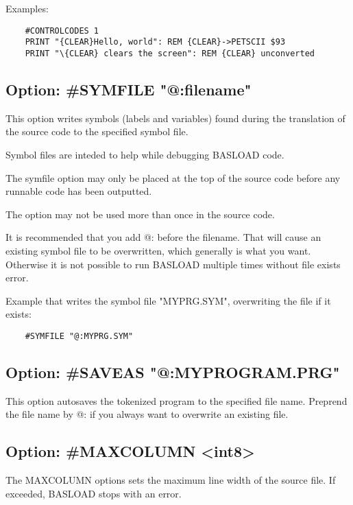 \documentclass{article}
\begin{document}
        Examples:

    \begin{verbatim}
    #CONTROLCODES 1
    PRINT "{CLEAR}Hello, world": REM {CLEAR}->PETSCII $93
    PRINT "\{CLEAR} clears the screen": REM {CLEAR} unconverted
    \end{verbatim}

    \subsection{Option: \#SYMFILE "@:filename"}

        This option writes symbols (labels and variables) found during the
        translation of the source code to the specified
        symbol file.

        Symbol files are inteded to help while debugging BASLOAD code.
    
        The symfile option may only be placed at the top of
        the source code before any runnable code has
        been outputted.

        The option may not be used more than once in the source code.

        It is recommended that you add @: before the filename. That will cause
        an existing symbol file to be overwritten, which generally is what you
        want. Otherwise it is not possible to run BASLOAD multiple times
        without file exists error.

        Example that writes the symbol file "MYPRG.SYM", overwriting the
        file if it exists:
        \begin{verbatim}
    #SYMFILE "@:MYPRG.SYM"
        \end{verbatim}

    \subsection{Option: \#SAVEAS "@:MYPROGRAM.PRG"}
        
        This option autosaves the tokenized program to the
        specified file name. Preprend the file name by
        @: if you always want to overwrite an existing file.

    \subsection{Option: \#MAXCOLUMN \textless int8\textgreater}
    
        The MAXCOLUMN options sets the maximum line width
        of the source file. If exceeded, BASLOAD stops with an
        error.
\end{document}
